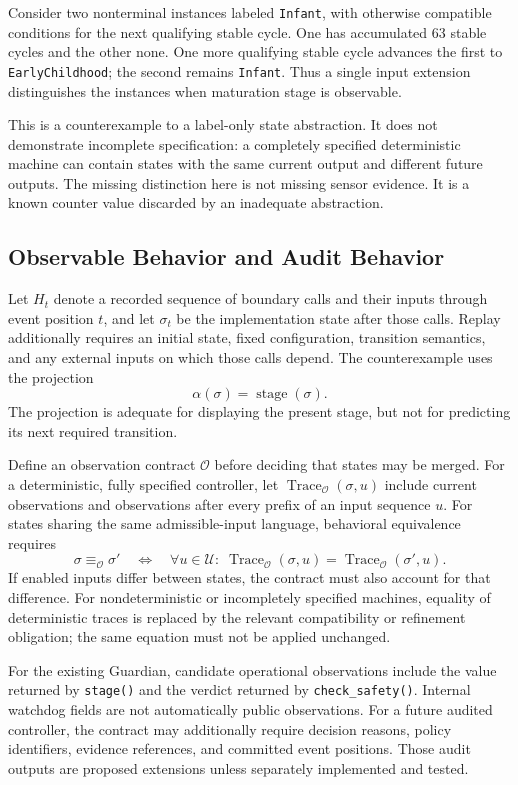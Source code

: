 \documentclass[11pt]{article}
\begin{document}
Consider two nonterminal instances labeled \texttt{Infant}, with otherwise compatible conditions for the next qualifying stable cycle. One has accumulated 63 stable cycles and the other none. One more qualifying stable cycle advances the first to \texttt{EarlyChildhood}; the second remains \texttt{Infant}. Thus a single input extension distinguishes the instances when maturation stage is observable.

This is a counterexample to a label-only state abstraction. It does not demonstrate incomplete specification: a completely specified deterministic machine can contain states with the same current output and different future outputs. The missing distinction here is not missing sensor evidence. It is a known counter value discarded by an inadequate abstraction.

\subsection{Observable Behavior and Audit Behavior}
Let $H_t$ denote a recorded sequence of boundary calls and their inputs through event position $t$, and let $\sigma_t$ be the implementation state after those calls. Replay additionally requires an initial state, fixed configuration, transition semantics, and any external inputs on which those calls depend. The counterexample uses the projection
\[
\alpha(\sigma)=\operatorname{stage}(\sigma).
\]
The projection is adequate for displaying the present stage, but not for predicting its next required transition.

Define an observation contract $\mathcal O$ before deciding that states may be merged. For a deterministic, fully specified controller, let $\operatorname{Trace}_{\mathcal O}(\sigma,u)$ include current observations and observations after every prefix of an input sequence $u$. For states sharing the same admissible-input language, behavioral equivalence requires
\[
\sigma\equiv_{\mathcal O}\sigma'
\quad\Longleftrightarrow\quad
\forall u\in\mathcal U:\;
\operatorname{Trace}_{\mathcal O}(\sigma,u)
=\operatorname{Trace}_{\mathcal O}(\sigma',u).
\]
If enabled inputs differ between states, the contract must also account for that difference. For nondeterministic or incompletely specified machines, equality of deterministic traces is replaced by the relevant compatibility or refinement obligation; the same equation must not be applied unchanged.

For the existing Guardian, candidate operational observations include the value returned by \texttt{stage()} and the verdict returned by \texttt{check\_safety()}. Internal watchdog fields are not automatically public observations. For a future audited controller, the contract may additionally require decision reasons, policy identifiers, evidence references, and committed event positions. Those audit outputs are proposed extensions unless separately implemented and tested.
\end{document}
